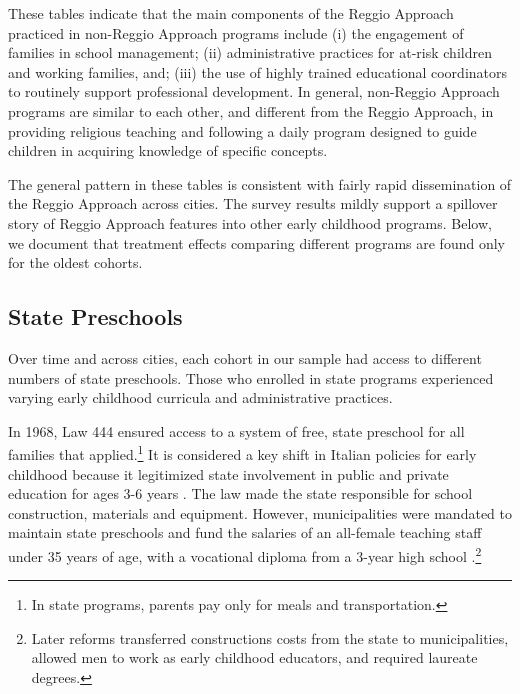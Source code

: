 These tables indicate that the main components of the Reggio Approach practiced in non-Reggio Approach programs include (i) the engagement of families in school management; (ii) administrative practices for at-risk children and working families, and; (iii) the use of highly trained educational coordinators to routinely support professional development. In general, non-Reggio Approach programs are similar to each other, and different from the Reggio Approach, in providing religious teaching and following a daily program designed to guide children in acquiring knowledge of specific concepts.

The general pattern in these tables is consistent with fairly rapid dissemination of the Reggio Approach across cities. The survey results mildly support a spillover story of Reggio Approach features into other early childhood programs. Below, we document that treatment effects comparing different programs are found only for the oldest cohorts.

\subsection{State Preschools}

Over time and across cities, each cohort in our sample had access to different numbers of state preschools. Those who enrolled in state programs experienced varying early childhood curricula and administrative practices.

In 1968, Law 444 ensured access to a system of free, state preschool for all families that applied.\footnote{In state programs, parents pay only for meals and transportation.} It is considered a key shift in Italian policies for early childhood because it legitimized state involvement in public and private education for ages 3-6 years \citep{Hohnerlein_2009_Paradox-Public-Preschools}. The law made the state responsible for school construction, materials and equipment. However, municipalities were mandated to maintain state preschools and fund the salaries of an all-female teaching staff under 35 years of age, with a vocational diploma from a 3-year high school \citep{OECD_2001_Italy-Country-Note}.\footnote{Later reforms transferred constructions costs from the state to municipalities, allowed men to work as early childhood educators, and required laureate degrees.}

